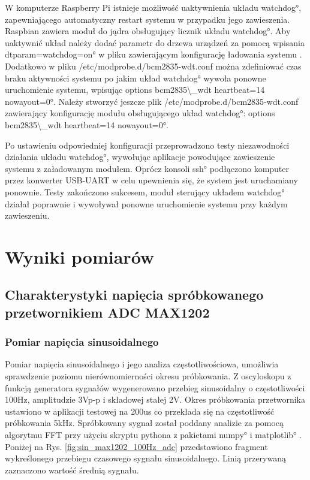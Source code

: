 W komputerze Raspberry Pi istnieje możliwość uaktywnienia układu \ang{watchdog}, zapewniającego automatyczny restart systemu w przypadku jego zawieszenia. 
Raspbian zawiera moduł do jądra obsługujący licznik układu \ang{watchdog}. 
Aby uaktywnić układ należy dodać parametr do drzewa urządzeń za pomocą wpisania \ang{dtparam=watchdog=on} w pliku zawierającym konfigurację ładowania systemu \cite{watchdog}. Dodatkowo w pliku /etc/modprobe.d/bcm2835-wdt.conf można zdefiniować czas braku aktywności systemu po jakim układ \ang{watchdog} wywoła ponowne uruchomienie systemu, wpisując \ang{options bcm2835\_wdt heartbeat=14 nowayout=0}. Należy stworzyć jeszcze plik /etc/modprobe.d/bcm2835-wdt.conf zawierający konfigurację modułu obsługującego układ \ang{watchdog}: \ang{options bcm2835\_wdt heartbeat=14 nowayout=0}.

Po ustawieniu odpowiedniej konfiguracji przeprowadzono testy niezawodności działania układu \ang{watchdog}, wywołując aplikacje powodujące zawieszenie systemu z załadowanym modułem. Oprócz konsoli \ang{ssh} podłączono komputer przez konwerter USB-UART w celu upewnienia się, że system jest uruchamiany ponownie.
Testy zakończono sukcesem, moduł sterujący układem \ang{watchdog} działał poprawnie i wywoływał ponowne uruchomienie systemu przy każdym zawieszeniu. 


\section{Wyniki pomiarów}


\subsection{Charakterystyki napięcia spróbkowanego przetwornikiem ADC MAX1202}

\subsubsection{Pomiar napięcia sinusoidalnego}

Pomiar napięcia sinusoidalnego i jego analiza częstotliwościowa, umożliwia sprawdzenie poziomu nierównomierności okresu próbkowania. 
Z oscyloskopu z funkcją generatora sygnałów wygenerowano przebieg sinusoidalny o częstotliwości 100Hz, amplitudzie 3Vp-p i składowej stałej 2V. Okres próbkowania przetwornika ustawiono w aplikacji testowej na 200us co przekłada się na częstotliwość próbkowania 5kHz. 
Spróbkowany sygnał został poddany analizie za pomocą algorytmu FFT przy użyciu skryptu pythona z pakietami \ang{numpy} i  \ang{matplotlib} .
Poniżej na Rys. \ref{fig:sin_max1202_100Hz_adc} przedstawiono fragment wykreślonego przebiegu czasowego sygnału sinusoidalnego. Linią przerywaną zaznaczono wartość średnią sygnału.


